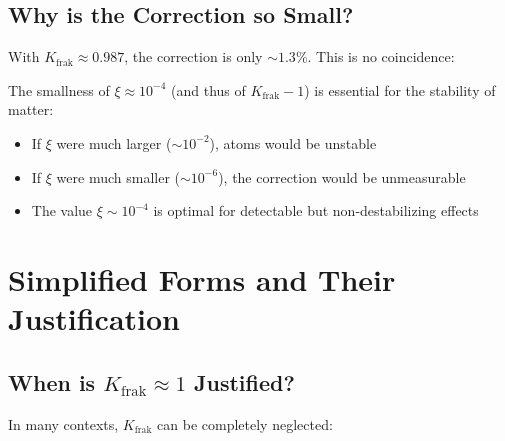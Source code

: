 	\subsection{Why is the Correction so Small?}
	
	With $K_{\text{frak}} \approx 0.987$, the correction is only $\sim 1.3\%$. This is no coincidence:
	
	\begin{tcolorbox}[colback=blue!5!white,colframe=blue!75!black,title={Fine-Tuning of Nature}]
		The smallness of $\xi \approx 10^{-4}$ (and thus of $K_{\text{frak}} - 1$) is essential for the stability of matter:
		
		\begin{itemize}
			\item If $\xi$ were much larger ($\sim 10^{-2}$), atoms would be unstable
			\item If $\xi$ were much smaller ($\sim 10^{-6}$), the correction would be unmeasurable
			\item The value $\xi \sim 10^{-4}$ is optimal for detectable but non-destabilizing effects
		\end{itemize}
	\end{tcolorbox}
	
	\section{Simplified Forms and Their Justification}
	
	\subsection{When is $K_{\text{frak}} \approx 1$ Justified?}
	
	In many contexts, $K_{\text{frak}}$ can be completely neglected:
	
	\begin{table}[h]
		\centering
		\caption{Justification for neglecting $K_{\text{frak}}$}
	\end{table}
	
